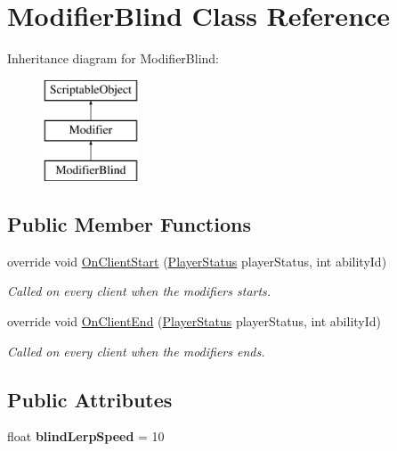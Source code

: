 \hypertarget{class_modifier_blind}{}\section{Modifier\+Blind Class Reference}
\label{class_modifier_blind}
Inheritance diagram for Modifier\+Blind\+:\begin{figure}[H]
\begin{center}
\leavevmode
\includegraphics[height=3.000000cm]{class_modifier_blind}
\end{center}
\end{figure}
\subsection*{Public Member Functions}
\begin{DoxyCompactItemize}
\item 
override void \hyperlink{class_modifier_blind_a8cfcbe75907fe9a029b76fedb581ddae}{On\+Client\+Start} (\hyperlink{class_player_status}{Player\+Status} player\+Status, int ability\+Id)
\begin{DoxyCompactList}\small\item\em Called on every client when the modifiers starts. \end{DoxyCompactList}\item 
override void \hyperlink{class_modifier_blind_a4423072654e3eeafc3f12475e3d6c56d}{On\+Client\+End} (\hyperlink{class_player_status}{Player\+Status} player\+Status, int ability\+Id)
\begin{DoxyCompactList}\small\item\em Called on every client when the modifiers ends. \end{DoxyCompactList}\end{DoxyCompactItemize}
\subsection*{Public Attributes}
\begin{DoxyCompactItemize}
\item 
\hypertarget{class_modifier_blind_a9a768afcc5a510f9175ffa91b3e280c1}{}\label{class_modifier_blind_a9a768afcc5a510f9175ffa91b3e280c1} 
float {\bfseries blind\+Lerp\+Speed} = 10
\end{DoxyCompactItemize}

